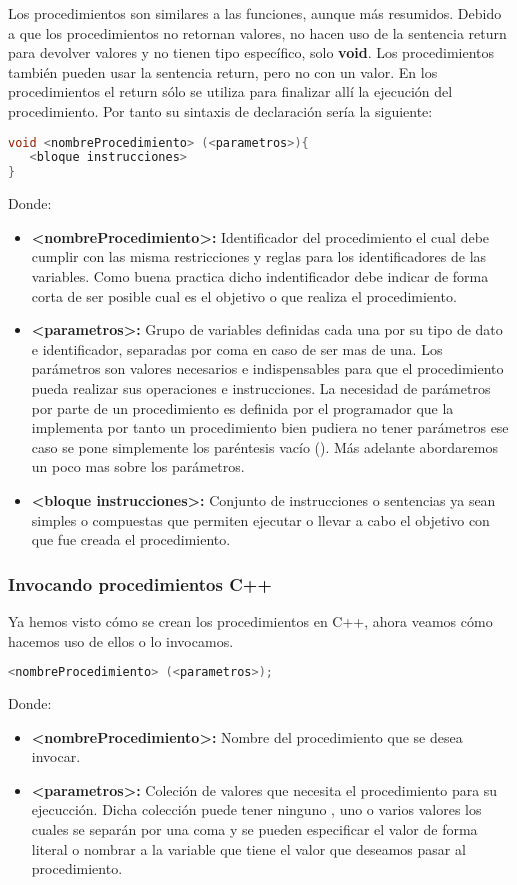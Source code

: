 Los procedimientos son similares a las funciones, aunque más resumidos. Debido a que los procedimientos no retornan valores, no hacen uso de la sentencia return para devolver valores y no tienen tipo específico, solo \textbf{void}. Los procedimientos también pueden usar la sentencia return, pero no con un valor. En los procedimientos el return sólo se utiliza para finalizar allí la ejecución del procedimiento. Por tanto su sintaxis de declaración sería la siguiente:

\begin{lstlisting}[language=C++]
void <nombreProcedimiento> (<parametros>){
   <bloque instrucciones>
}
\end{lstlisting}

Donde:

\begin{itemize}
	\item \textbf{<nombreProcedimiento>:} Identificador del procedimiento el cual debe cumplir con las misma restricciones y reglas para los identificadores de las variables. Como buena practica dicho indentificador debe indicar de forma corta de ser posible cual es el objetivo o que realiza el procedimiento.
	\item \textbf{<parametros>:} Grupo de variables definidas cada una por su tipo de dato e identificador, separadas por coma en caso de ser mas de una. Los parámetros son valores necesarios e indispensables para que el procedimiento pueda realizar sus operaciones e instrucciones. La necesidad de parámetros por parte de un procedimiento es definida por el programador que la implementa por tanto un procedimiento bien pudiera no tener parámetros ese caso se pone simplemente los paréntesis vacío (). Más adelante abordaremos un poco mas sobre los parámetros.  
	\item \textbf{<bloque instrucciones>:} Conjunto de instrucciones o sentencias ya sean simples o compuestas que permiten ejecutar o llevar a cabo el objetivo con que fue creada el procedimiento. 
\end{itemize}

\subsubsection{Invocando procedimientos C++}

Ya hemos visto cómo se crean los procedimientos en C++, ahora veamos cómo hacemos uso de ellos o lo invocamos.

\begin{lstlisting}[language=C++]
<nombreProcedimiento> (<parametros>);
\end{lstlisting} 

Donde:

\begin{itemize}
	\item \textbf{<nombreProcedimiento>:} Nombre del procedimiento que se desea invocar.
	\item \textbf{<parametros>:} Coleción de valores que necesita el procedimiento para su ejecucción. Dicha colección puede tener ninguno , uno o varios valores los cuales se separán por una coma y se pueden especificar el valor de forma literal o nombrar a la variable que tiene el valor que deseamos pasar al procedimiento. 
\end{itemize}
